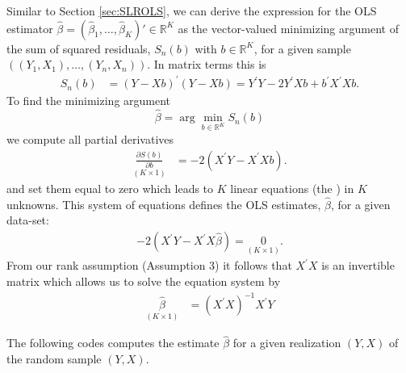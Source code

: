 \documentclass[
  14pt,
]{memoir}
\begin{document}
Similar to Section \ref{sec:SLROLS}, we can derive the expression for the OLS estimator \(\hat\beta=(\hat\beta_1,\dots,\hat\beta_K)'\in\mathbb{R}^K\) as the vector-valued minimizing argument of the sum of squared residuals, \(S_n(b)\) with \(b\in\mathbb{R}^K\), for a given sample \(((Y_1,X_1),\dots,(Y_n,X_n))\). In matrix terms this is
\begin{align*}
S_n(b)&=(Y-X b)^{\prime}(Y-X b)=Y^{\prime}Y-2 Y^{\prime} X b+b^{\prime} X^{\prime} X b.
\end{align*}
To find the minimizing argument \[\hat\beta=\arg\min_{b\in\mathbb{R}^K}S_n(b)\] we compute all partial derivatives
\[
\begin{aligned}
\underset{(K\times 1)}{\frac{\partial S(b)}{\partial b}} &=-2\left(X^{\prime}Y -X^{\prime} Xb\right).
\end{aligned}
\]
and set them equal to zero which leads to \(K\) linear equations (the ) in \(K\) unknowns. This system of equations defines the OLS estimates, \(\hat{\beta}\), for a given data-set:
\[
\begin{aligned}
-2\left(X^{\prime}Y -X^{\prime} X\hat{\beta}\right)=\underset{(K\times 1)}{0}.
\end{aligned}
\]
From our rank assumption (Assumption 3) it follows that \(X^{\prime}X\) is an invertible matrix which allows us to solve the equation system by
\[
\begin{aligned}
\underset{(K\times 1)}{\hat{\beta}} &=\left(X^{\prime} X\right)^{-1} X^{\prime} Y
\end{aligned}
\]

The following codes computes the estimate \(\hat{\beta}\) for a given realization \((Y,X)\) of the random sample \((Y,X)\).
\end{document}
